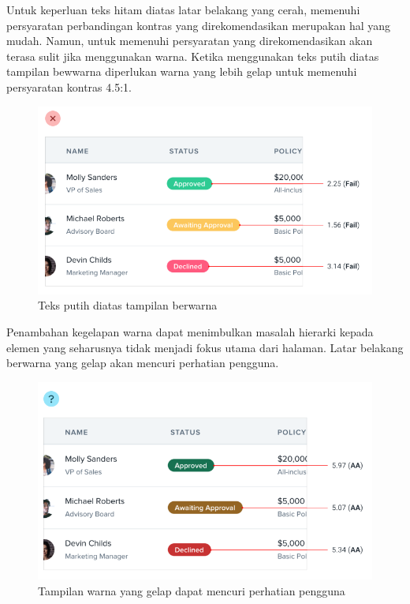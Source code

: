 Untuk keperluan teks hitam diatas latar belakang yang cerah, memenuhi persyaratan perbandingan kontras yang direkomendasikan merupakan hal yang mudah. Namun, untuk memenuhi persyaratan yang direkomendasikan akan terasa sulit jika menggunakan warna. Ketika menggunakan teks putih diatas tampilan bewwarna diperlukan warna yang lebih gelap untuk memenuhi persyaratan kontras 4.5:1. 

\begin{figure}[H]
	{\centering
		\includegraphics[keepaspectratio, width=12cm]{gambar/g-102.png}
		\caption{Teks putih diatas tampilan berwarna \citep{refactoringui}}}
	\label{gambar:g-102.png}
\end{figure}

Penambahan kegelapan warna dapat menimbulkan masalah hierarki kepada elemen yang seharusnya tidak menjadi fokus utama dari halaman. Latar belakang berwarna yang gelap akan mencuri perhatian pengguna.

\begin{figure}[H]
	{\centering
		\includegraphics[keepaspectratio, width=12cm]{gambar/g-103.png}
		\caption{Tampilan warna yang gelap dapat mencuri perhatian pengguna \citep{refactoringui}}}
	\label{gambar:g-103.png}
\end{figure}

